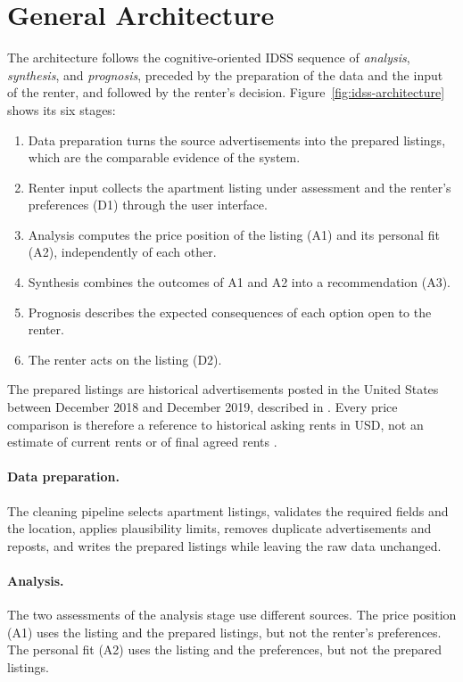 \documentclass[12pt,a4paper]{report}
\begin{document}
\section{General Architecture}

The architecture follows the cognitive-oriented IDSS sequence of
\emph{analysis}, \emph{synthesis}, and \emph{prognosis}, preceded by the
preparation of the data and the input of the renter, and followed by the
renter's decision. Figure~\ref{fig:idss-architecture} shows its six
stages:

\begin{enumerate}[leftmargin=*]
  \item Data preparation turns the source advertisements into the prepared
  listings, which are the comparable evidence of the system.
  \item Renter input collects the apartment listing under assessment and the
  renter's preferences (D1) through the user interface.
  \item Analysis computes the price position of the listing (A1) and its
  personal fit (A2), independently of each other.
  \item Synthesis combines the outcomes of A1 and A2 into a recommendation
  (A3).
  \item Prognosis describes the expected consequences of each option open to
  the renter.
  \item The renter acts on the listing (D2).
\end{enumerate}

The prepared listings are historical advertisements posted in the United
States between December 2018 and December 2019, described in
. Every price comparison is therefore a reference to
historical asking rents in USD, not an estimate of current rents or of
final agreed rents \cite{uci_apartment_dataset}.

\paragraph{Data preparation.} The cleaning pipeline selects apartment
listings, validates the required fields and the location, applies
plausibility limits, removes duplicate advertisements and reposts, and
writes the prepared listings while leaving the raw data unchanged.

\paragraph{Analysis.} The two assessments of the analysis stage use
different sources. The price position (A1) uses the listing and the
prepared listings, but not the renter's preferences. The personal fit (A2)
uses the listing and the preferences, but not the prepared listings.
\end{document}
